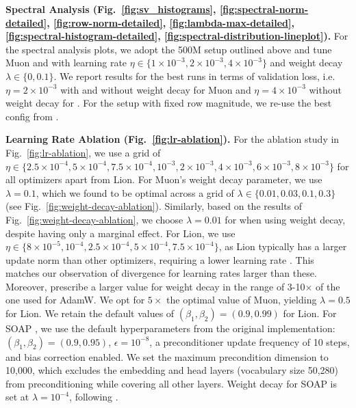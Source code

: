 \textbf{Spectral Analysis (Fig.~\ref{fig:sv_histograms}, \ref{fig:spectral-norm-detailed}, \ref{fig:row-norm-detailed}, \ref{fig:lambda-max-detailed}, \ref{fig:spectral-histogram-detailed}, \ref{fig:spectral-distribution-lineplot}). } For the spectral analysis plots, we adopt the 500M setup outlined above and tune Muon and \algname{} with learning rate $\eta \in \{1 \times 10^{-3}, 2 \times 10^{-3}, 4 \times 10^{-3}\}$ and weight decay $\lambda \in \{ 0, 0.1 \}$. We report results for the best runs in terms of validation loss, i.e. $\eta = 2 \times 10^{-3}$ with and without weight decay for Muon and $\eta = 4 \times 10^{-3}$ without weight decay for \algname{}. For the setup with fixed row magnitude, we re-use the best config from \algname{}.

\textbf{Learning Rate Ablation (Fig.~\ref{fig:lr-ablation}).} For the ablation study in Fig.~\ref{fig:lr-ablation}, we use a grid of $\eta \in \{2.5 \times 10^{-4}, 5 \times 10^{-4}, 7.5 \times 10^{-4}, 10^{-3}, 2 \times 10^{-3}, 4 \times 10^{-3}, 6 \times 10^{-3}, 8 \times 10^{-3}\}$ for all optimizers apart from Lion. For Muon's weight decay parameter, we use $\lambda=0.1$, which we found to be optimal across a grid of $\lambda \in \{0.01, 0.03, 0.1, 0.3\}$ (see Fig.~\ref{fig:weight-decay-ablation}). Similarly, based on the results of Fig.~\ref{fig:weight-decay-ablation}, we choose $\lambda=0.01$ for \algname{} when using weight decay, despite having only a marginal effect. For Lion, we use $\eta \in \{ 8 \times 10^{-5}, 10^{-4}, 2.5 \times 10^{-4}, 5 \times 10^{-4}, 7.5 \times 10^{-4}\}$, as Lion typically has a larger update norm than other optimizers, requiring a lower learning rate \citep{chen_symbolic_2023}. This matches our observation of divergence for learning rates larger than these. Moreover, \cite{chen_symbolic_2023} prescribe a larger value for weight decay in the range of 3-10$\times$ of the one used for AdamW. We opt for $5\times$ the optimal value of Muon, yielding $\lambda=0.5$ for Lion. We retain the default values of $(\beta_1, \beta_2) = (0.9, 0.99)$ for Lion. For SOAP \citep{vyas_soap_2024}, we use the default hyperparameters from the original implementation: $(\beta_1, \beta_2) = (0.9, 0.95)$, $\epsilon = 10^{-8}$, a preconditioner update frequency of 10 steps, and bias correction enabled. We set the maximum precondition dimension to 10{,}000, which excludes the embedding and head layers (vocabulary size 50{,}280) from preconditioning while covering all other layers. Weight decay for SOAP is set at $\lambda=10^{-4}$, following \cite{vyas_soap_2024}.

